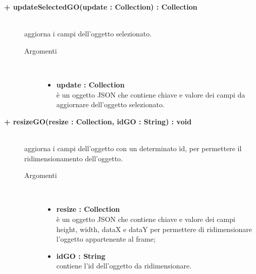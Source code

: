 \begin{description}
\begin{description}
\begin{description}
\end{description}

\end{description}

\begin{description}
		\item[\textbf{+ updateSelectedGO(update : Collection) : Collection			}] \hfill \\
			aggiorna i campi dell'oggetto selezionato.   

\begin{description}
			\item[Argomenti] \hfill \\
				\begin{itemize}
						\item \textbf{update : Collection			} \hfill \\
					è un oggetto JSON che contiene chiave e valore dei campi da aggiornare dell'oggetto selezionato.
				\end{itemize}

\end{description}

\end{description}

\begin{description}
		\item[\textbf{+ resizeGO(resize : Collection, idGO : String) : void			}] \hfill \\
			aggiorna i campi dell'oggetto con un determinato id, per permettere il ridimensionamento dell'oggetto.    

\begin{description}
			\item[Argomenti] \hfill \\
				\begin{itemize}
					\item \textbf{resize : Collection			} \hfill \\
					è un oggetto JSON che contiene chiave e valore dei campi height, width, dataX e dataY per permettere di ridimensionare l'oggetto appartenente al frame;
					\item \textbf{idGO : String			} \hfill \\
					contiene l'id dell'oggetto da ridimensionare.
				\end{itemize}

\end{description}


\end{description}
\end{description}
